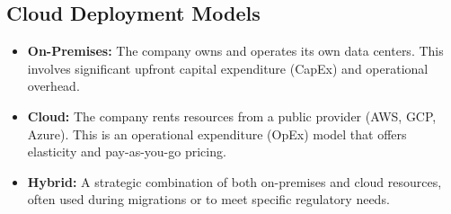 \documentclass{article}
\begin{document}
\subsection{Cloud Deployment Models}
\begin{itemize}
    \item \textbf{On-Premises:} The company owns and operates its own data centers. This involves significant upfront capital expenditure (CapEx) and operational overhead.
    \item \textbf{Cloud:} The company rents resources from a public provider (AWS, GCP, Azure). This is an operational expenditure (OpEx) model that offers elasticity and pay-as-you-go pricing.
    \item \textbf{Hybrid:} A strategic combination of both on-premises and cloud resources, often used during migrations or to meet specific regulatory needs.
\end{itemize}
\end{document}

